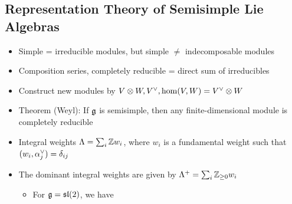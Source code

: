 \hypertarget{representation-theory-of-semisimple-lie-algebras}{%
\subsection{Representation Theory of Semisimple Lie
Algebras}\label{representation-theory-of-semisimple-lie-algebras}}

\begin{itemize}
\tightlist
\item
  Simple = irreducible modules, but simple \(\neq\) indecomposable
  modules
\item
  Composition series, completely reducible = direct sum of irreducibles
\item
  Construct new modules by
  \(V\otimes W, V^\vee, \hom(V, W) = V^\vee \otimes W\)
\item
  Theorem (Weyl): If \({\mathfrak{g}}\) is semisimple, then any
  finite-dimensional module is completely reducible
\item
  Integral weights \(\Lambda = \sum_i {\mathbb{Z}} w_i\), where \(w_i\) is a
  fundamental weight such that \((w_i, \alpha_j^\vee) = \delta_{ij}\)
\item
  The dominant integral weights are given by
  \(\Lambda^+ = \sum_i {\mathbb{Z}}_{\geq 0} w_i\)

  \begin{itemize}
  \tightlist
  \item
    For \({\mathfrak{g}} = {\mathfrak{sl}}(2)\), we have


\end{itemize}
\end{itemize}

